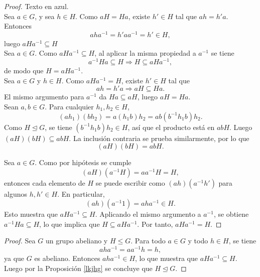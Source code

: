 \begin{proof}
	{\color{white} Texto en azul.}\\
	
	\noindent[$1 \Rightarrow 2$] Sea \( a \in G \), y sea \( h \in H \). Como \( aH = Ha \), existe \( h' \in H \) tal que \( ah = h'a \). Entonces
	\[
	a h a^{-1} = h' a a^{-1} = h' \in H,
	\]
	luego \( aHa^{-1} \subseteq H \)\\
	
	\noindent	\noindent[$2 \Rightarrow 3$] Sea \( a \in G \). Como \( aHa^{-1} \subseteq H \), al aplicar la misma propiedad a \( a^{-1} \) se tiene
	\[
	a^{-1}Ha \subseteq H \Rightarrow H \subseteq aHa^{-1},
	\]
	de modo que \( H = aHa^{-1} \).\\
	
	\noindent	\noindent[$3 \Rightarrow 1$] Sea \( a \in G \) y \( h \in H \). Como \( aHa^{-1} = H \), existe \( h' \in H \) tal que
	\[
	a h = h' a \Rightarrow aH \subseteq Ha.
	\]
	El mismo argumento para \( a^{-1} \) da \( Ha \subseteq aH \), luego \( aH = Ha \).\\

	\noindent[$3 \Rightarrow 4$] Sean \( a, b \in G \). Para cualquier \( h_1, h_2 \in H \),
	\[
	(a h_1)(b h_2) = a (h_1 b) h_2 = a b (b^{-1} h_1 b)h_2 .
	\]
	Como \( H \trianglelefteq G \), se tiene \( (b^{-1} h_1 b) h_2 \in H \), así que el producto está en \( abH \). Luego \( (aH)(bH) \subseteq abH \). La inclusión contraria se prueba similarmente, por lo que \[ (aH)(bH) = abH. \]
	
	\noindent[$4 \Rightarrow 3$] Sea \( a \in G \). Como por hipótesis se cumple
	\[
	(aH)(a^{-1}H) = aa^{-1}H = H,
	\]
	entonces cada elemento de \( H \) se puede escribir como \( (ah)(a^{-1}h') \) para algunos \( h, h' \in H \). En particular,
	\[
	(ah)(a^{-1}1) = aha^{-1} \in H.
	\]
	Esto muestra que \( aHa^{-1} \subseteq H \). Aplicando el mismo argumento a \( a^{-1} \), se obtiene \( a^{-1}Ha \subseteq H \), lo que implica que \( H \subseteq aHa^{-1} \). Por tanto, \( aHa^{-1} = H \).
	
	
	
\end{proof}

\begin{proposicion}
\end{proposicion}

\begin{proof}
	Sea \( G \) un grupo abeliano y \( H \leq G \). Para todo \( a \in G \) y todo \( h \in H \), se tiene
	\[
	a h a^{-1} = a a^{-1} h = h,
	\]
	ya que \( G \) es abeliano. Entonces \( a h a^{-1} \in H \), lo que muestra que \( a H a^{-1} \subseteq H \). Luego por la Proposición \ref{lkjhg} se concluye que \( H \trianglelefteq G \).
\end{proof}






